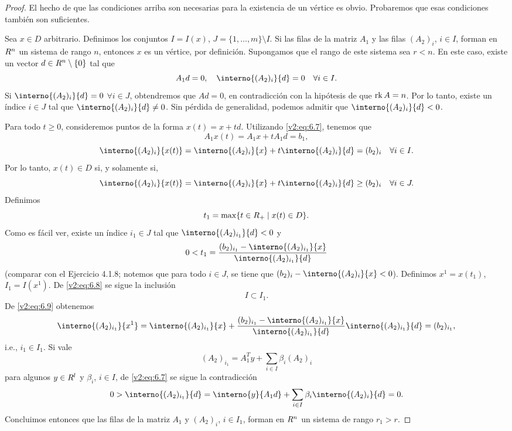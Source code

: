 \begin{proof}
    El hecho de que las condiciones arriba son necesarias para la existencia de un vértice es obvio. Probaremos que esas condiciones también son suficientes.
    
    Sea $x \in D$ arbitrario. Definimos los conjuntos $I = I(x)$, $J = \{1, \dots, m\} \setminus I$. Si las filas de la matriz $A_1$ y las filas $(A_2)_i$, $i \in I$, forman en $R^n$ un sistema de rango $n$, entonces $x$ es un vértice, por definición. Supongamos que el rango de este sistema sea $r < n$. En este caso, existe un vector $d \in R^n \setminus \{0\}$ tal que
    \begin{equation}
        A_1 d = 0, \quad \interno{(A_2)_i}{d} = 0 \quad \forall i \in I.
        \label{v2:eq:6.7}
    \end{equation}
    Si $\interno{(A_2)_i}{d} = 0$ $\forall i \in J$, obtendremos que $Ad = 0$, en contradicción con la hipótesis de que $\operatorname{rk} A = n$. Por lo tanto, existe un índice $i \in J$ tal que $\interno{(A_2)_i}{d} \neq 0$. Sin pérdida de generalidad, podemos admitir que $\interno{(A_2)_i}{d} < 0$.
    
    Para todo $t \ge 0$, consideremos puntos de la forma $x(t) = x + td$. Utilizando \eqref{v2:eq:6.7}, tenemos que
    \[
        A_1 x(t) = A_1 x + t A_1 d = b_1,
    \]
    \begin{equation}
        \interno{(A_2)_i}{x(t)} = \interno{(A_2)_i}{x} + t\interno{(A_2)_i}{d} = (b_2)_i \quad \forall i \in I.
        \label{v2:eq:6.8}
    \end{equation}
    Por lo tanto, $x(t) \in D$ si, y solamente si,
    \[
        \interno{(A_2)_i}{x(t)} = \interno{(A_2)_i}{x} + t\interno{(A_2)_i}{d} \ge (b_2)_i \quad \forall i \in J.
    \]
    Definimos
    \[
        t_1 = \max \{ t \in R_+ \mid x(t) \in D \}.
    \]
    Como es fácil ver, existe un índice $i_1 \in J$ tal que $\interno{(A_2)_{i_1}}{d} < 0$ y
    \begin{equation}
        0 < t_1 = \frac{(b_2)_{i_1} - \interno{(A_2)_{i_1}}{x}}{\interno{(A_2)_{i_1}}{d}}
        \label{v2:eq:6.9}
    \end{equation}
    (comparar con el Ejercicio 4.1.8; notemos que para todo $i \in J$, se tiene que $(b_2)_i - \interno{(A_2)_i}{x} < 0$).
    Definimos $x^1 = x(t_1)$, $I_1 = I(x^1)$. De \eqref{v2:eq:6.8} se sigue la inclusión
    \begin{equation}
        I \subset I_1.
        \label{v2:eq:6.10}
    \end{equation}
    De \eqref{v2:eq:6.9} obtenemos
    \[
        \interno{(A_2)_{i_1}}{x^1} = \interno{(A_2)_{i_1}}{x} + \frac{(b_2)_{i_1} - \interno{(A_2)_{i_1}}{x}}{\interno{(A_2)_{i_1}}{d}} \interno{(A_2)_{i_1}}{d} = (b_2)_{i_1},
    \]
    i.e., $i_1 \in I_1$. Si vale
    \[
        (A_2)_{i_1} = A_1^T y + \sum_{i \in I} \beta_i (A_2)_i
    \]
    para algunos $y \in R^l$ y $\beta_i$, $i \in I$, de \eqref{v2:eq:6.7} se sigue la contradicción
    \[
        0 > \interno{(A_2)_{i_1}}{d} = \interno{y}{A_1 d} + \sum_{i \in I} \beta_i \interno{(A_2)_i}{d} = 0.
    \]
    Concluimos entonces que las filas de la matriz $A_1$ y $(A_2)_i$, $i \in I_1$, forman en $R^n$ un sistema de rango $r_1 > r$.
    

\end{proof}
